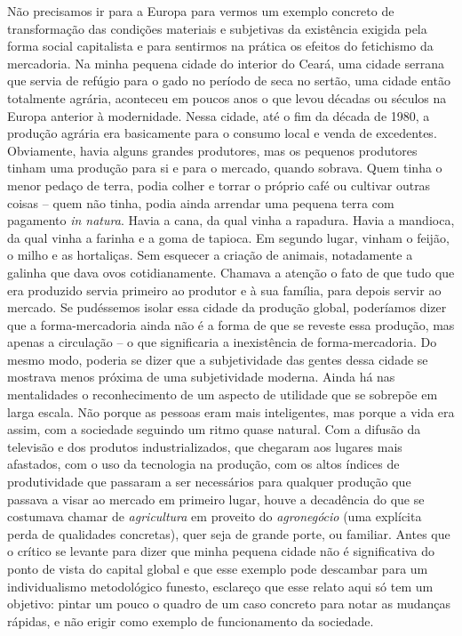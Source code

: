 Não precisamos ir para a Europa para vermos um exemplo concreto de
transformação das condições materiais e subjetivas da existência exigida
pela forma social capitalista e para sentirmos na prática os efeitos do
fetichismo da mercadoria. Na minha pequena cidade do interior do Ceará,
uma cidade serrana que servia de refúgio para o gado no período de seca
no sertão, uma cidade então totalmente agrária, aconteceu em poucos anos
o que levou décadas ou séculos na Europa anterior à modernidade. Nessa
cidade, até o fim da década de 1980, a produção agrária era basicamente
para o consumo local e venda de excedentes. Obviamente, havia alguns
grandes produtores, mas os pequenos produtores tinham uma produção para
si e para o mercado, quando sobrava. Quem tinha o menor pedaço de terra,
podia colher e torrar o próprio café ou cultivar outras coisas -- quem
não tinha, podia ainda arrendar uma pequena terra com pagamento \emph{in
natura}. Havia a cana, da qual vinha a rapadura. Havia a mandioca, da
qual vinha a farinha e a goma de tapioca. Em segundo lugar, vinham o
feijão, o milho e as hortaliças. Sem esquecer a criação de animais,
notadamente a galinha que dava ovos cotidianamente. Chamava a atenção o
fato de que tudo que era produzido servia primeiro ao produtor e à sua
família, para depois servir ao mercado. Se pudéssemos isolar essa cidade
da produção global, poderíamos dizer que a forma-mercadoria ainda não é
a forma de que se reveste essa produção, mas apenas a circulação -- o
que significaria a inexistência de forma-mercadoria. Do mesmo modo,
poderia se dizer que a subjetividade das gentes dessa cidade se mostrava
menos próxima de uma subjetividade moderna. Ainda há nas mentalidades o
reconhecimento de um aspecto de utilidade que se sobrepõe em larga
escala. Não porque as pessoas eram mais inteligentes, mas porque a vida
era assim, com a sociedade seguindo um ritmo quase natural. Com a
difusão da televisão e dos produtos industrializados, que chegaram aos
lugares mais afastados, com o uso da tecnologia na produção, com os
altos índices de produtividade que passaram a ser necessários para
qualquer produção que passava a visar ao mercado em primeiro lugar,
houve a decadência do que se costumava chamar de \emph{agricultura} em
proveito do \emph{agronegócio} (uma explícita perda de qualidades
concretas), quer seja de grande porte, ou familiar. Antes que o crítico
se levante para dizer que minha pequena cidade não é significativa do
ponto de vista do capital global e que esse exemplo pode descambar para
um individualismo metodológico funesto, esclareço que esse relato aqui
só tem um objetivo: pintar um pouco o quadro de um caso concreto para
notar as mudanças rápidas, e não erigir como exemplo de funcionamento da
sociedade.


